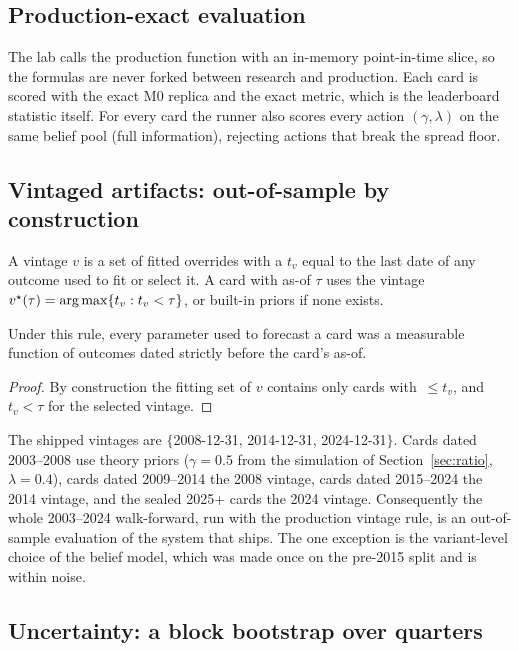 \subsection{Production-exact evaluation}

The lab calls the production function  with an in-memory point-in-time slice, so the formulas are never forked between
research and production. Each card is scored with the exact M0 replica and the exact metric, which is the leaderboard statistic itself. For every
card the runner also scores every action $(\gamma,\lambda)$ on the same belief pool (full information), rejecting actions that break the spread
floor.

\subsection{Vintaged artifacts: out-of-sample by construction}

\begin{definition}[Vintage]
A vintage $v$ is a set of fitted overrides with a  $t_v$ equal to the last date of any outcome used to fit or select it. A card
with as-of $\tau$ uses the vintage $v^\star(\tau)=\operatorname*{arg\,max}\{t_v: t_v<\tau\}$, or built-in priors if none exists.
\end{definition}

\begin{proposition}
Under this rule, every parameter used to forecast a card was a measurable function of outcomes dated strictly before the card's as-of.
\end{proposition}
\begin{proof}
By construction the fitting set of $v$ contains only cards with $\,\le t_v$, and $t_v<\tau$ for the selected vintage.
\end{proof}
The shipped vintages are $\{$2008-12-31, 2014-12-31, 2024-12-31$\}$. Cards dated 2003--2008 use theory priors ($\gamma=0.5$ from the simulation of
Section~\ref{sec:ratio}, $\lambda=0.4$), cards dated 2009--2014 the 2008 vintage, cards dated 2015--2024 the 2014 vintage, and the sealed 2025+ cards
the 2024 vintage. Consequently the whole 2003--2024 walk-forward, run with the production vintage rule, is an out-of-sample evaluation of the
system that ships. The one exception is the variant-level choice of the belief model, which was made once on the pre-2015 split and is within noise.

\subsection{Uncertainty: a block bootstrap over quarters}

